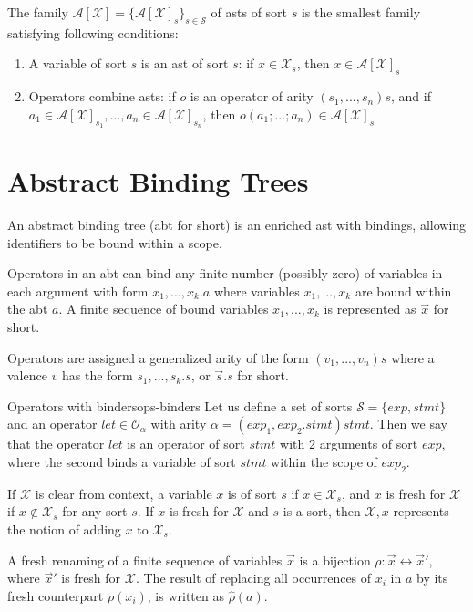 \documentclass{article}
\begin{document}
The family $\mathcal{A}[\mathcal{X}] = \{ \mathcal{A}[\mathcal{X}]_s \}_{s \in \mathcal{S}}$ of asts of sort $s$ is the smallest family satisfying following conditions:

\begin{enumerate}
    \item A variable of sort $s$ is an ast of sort $s$: if $x \in \mathcal{X}_s$, then $x \in \mathcal{A}[ \mathcal{X}]_s$
    \item Operators combine asts: if $o$ is an operator of arity $(s_1,...,s_n)s$, and if $a_1 \in \mathcal{A}[\mathcal{X}]_{s_1},...,a_n \in \mathcal{A}[\mathcal{X}]_{s_n}$, then $o(a_1;...;a_n) \in \mathcal{A}[\mathcal{X}]_s$
\end{enumerate}

\section{Abstract Binding Trees}
An abstract binding tree (abt for short) is an enriched ast with bindings, allowing identifiers to be bound within a scope.

Operators in an abt can bind any finite number (possibly zero) of variables in each argument with form $x_1,...,x_k.a$ where variables $x_1,...,x_k$ are bound within the abt $a$. A finite sequence of bound variables $x_1,...,x_k$ is represented as $\vec{x}$ for short.

Operators are assigned a generalized arity of the form $(v_1,...,v_n)s$ where a valence $v$ has the form $s_1,...,s_k.s$, or $\Vec{s}.s$ for short.

\begin{example}{Operators with binders}{ops-binders}
Let us define a set of sorts $\mathcal{S} = \{ exp, stmt \}$ and an operator $let \in \mathcal{O}_\alpha$ with arity $\alpha = (exp_1,exp_2.stmt)stmt$. Then we say that the operator $let$ is an operator of sort $stmt$ with 2 arguments of sort $exp$, where the second binds a variable of sort $stmt$ within the scope of $exp_2$.
\end{example}

If $\mathcal{X}$ is clear from context, a variable $x$ is of sort $s$ if $x \in \mathcal{X}_s$, and $x$ is fresh for $\mathcal{X}$ if $x \notin \mathcal{X}_s$ for any sort $s$. If $x$ is fresh for $\mathcal{X}$ and $s$ is a sort, then $\mathcal{X},x$ represents the notion of adding $x$ to $\mathcal{X}_s$. 

A fresh renaming of a finite sequence of variables $\vec{x}$ is a bijection $\rho: \vec{x} \leftrightarrow \vec{x}'$, where $\vec{x}'$ is fresh for $\mathcal{X}$. The result of replacing all occurrences of $x_i$ in $a$ by its fresh counterpart $\rho(x_i)$, is written as $\hat{\rho}(a)$.
\end{document}
